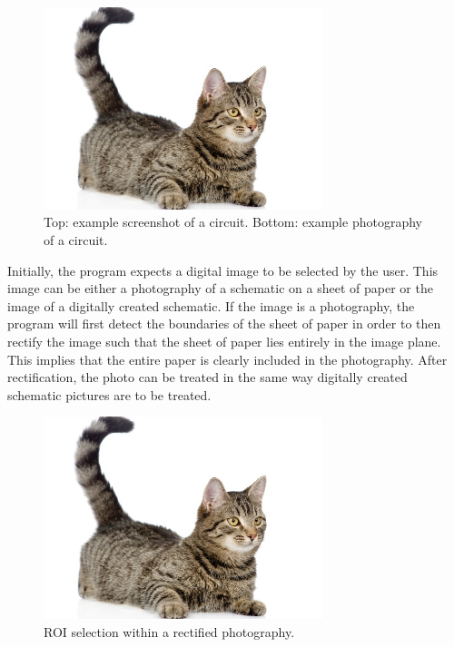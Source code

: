 \documentclass[10pt,twocolumn,letterpaper]{article}
\begin{document}
\begin{figure}[!ht]
\includegraphics[width = 3.2in]{img/cat.jpg}
\caption{Top: example screenshot of a circuit. Bottom: example photography of a circuit.}
\label{fig:c2}
\end{figure}

\par
Initially, the program expects a digital image to be selected by the user. This image can be either a photography of a schematic on a sheet of paper or the image of a digitally created schematic. If the image is a photography, the program will first detect the boundaries of the sheet of paper in order to then rectify the image such that the sheet of paper lies entirely in the image plane. This implies that the entire paper is clearly included in the photography. After rectification, the photo can be treated in the same way digitally created schematic pictures are to be treated.
\par

\begin{figure}[!ht]
\includegraphics[width = 3.2in]{img/cat.jpg}
\caption{ROI selection within a rectified photography.}
\label{fig:c3}
\end{figure}
\end{document}
